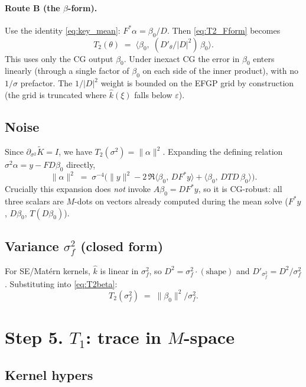 \documentclass[11pt]{article}
\numberwithin{equation}{section}
\newcommand{\Ktil}{\widetilde K}
\newcommand{\Amean}{A}
\begin{document}
\paragraph{Route B (the $\beta$-form).} Use the identity \eqref{eq:key_mean}:
$F^*\alpha = \beta_0/D$. Then \eqref{eq:T2_Fform} becomes
\begin{equation}
  \boxed{\;T_2(\theta) \;=\; \bigl\langle \beta_0,\; (D'_\theta/|D|^2)\,\beta_0\bigr\rangle.\;}
  \label{eq:T2beta}
\end{equation}
This uses only the CG output $\beta_0$. Under inexact CG the error in $\beta_0$
enters linearly (through a single factor of $\beta_0$ on each side of the inner
product), with no $1/\sigma$ prefactor. The $1/|D|^2$ weight is bounded on the
EFGP grid by construction (the grid is truncated where $\hat k(\xi)$ falls
below $\varepsilon$).

\subsection*{Noise}

Since $\partial_{\sigma^2}\Ktil = I$, we have $T_2(\sigma^2) = \|\alpha\|^2$.
Expanding the defining relation $\sigma^2\alpha = y - FD\beta_0$ directly,
\begin{equation}
  \boxed{\;\|\alpha\|^2 \;=\; \sigma^{-4}\bigl(\|y\|^2 - 2\,\Re\langle\beta_0,\,DF^*y\rangle + \langle\beta_0,\,DTD\,\beta_0\rangle\bigr).\;}
  \label{eq:T2noise}
\end{equation}
Crucially this expansion does \emph{not} invoke
$\Amean\beta_0 = DF^*y$, so it is CG-robust: all three scalars are $M$-dots on
vectors already computed during the mean solve ($F^*y$, $D\beta_0$,
$T(D\beta_0)$).

\subsection*{Variance $\sigma_f^2$ (closed form)}

For SE/Mat\'ern kernels, $\hat k$ is linear in $\sigma_f^2$, so
$D^2 = \sigma_f^2\cdot(\text{shape})$ and $D'_{\sigma_f^2} = D^2/\sigma_f^2$.
Substituting into \eqref{eq:T2beta}:
\[
  T_2(\sigma_f^2) \;=\; \|\beta_0\|^2/\sigma_f^2.
\]

\section{Step 5. $T_1$: trace in $M$-space}

\subsection*{Kernel hypers}
\end{document}
